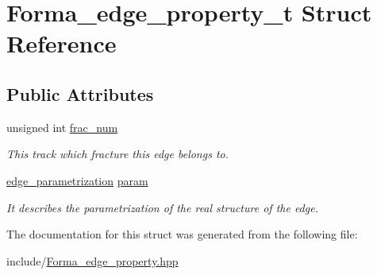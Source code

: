 \hypertarget{structForma__edge__property__t}{
\section{Forma\_\-edge\_\-property\_\-t Struct Reference}
\label{structForma__edge__property__t}
}
\subsection*{Public Attributes}
\begin{DoxyCompactItemize}
\item 
\hypertarget{structForma__edge__property__t_a19a172372d64ba7d3ffa79eaa22a5a2a}{
unsigned int \hyperlink{structForma__edge__property__t_a19a172372d64ba7d3ffa79eaa22a5a2a}{frac\_\-num}}
\label{structForma__edge__property__t_a19a172372d64ba7d3ffa79eaa22a5a2a}

\begin{DoxyCompactList}\small\item\em This track which fracture this edge belongs to. \item\end{DoxyCompactList}\item 
\hypertarget{structForma__edge__property__t_acc9640a769c9abce25e3e89310e7479c}{
\hyperlink{classedge__parametrization}{edge\_\-parametrization} \hyperlink{structForma__edge__property__t_acc9640a769c9abce25e3e89310e7479c}{param}}
\label{structForma__edge__property__t_acc9640a769c9abce25e3e89310e7479c}

\begin{DoxyCompactList}\small\item\em It describes the parametrization of the real structure of the edge. \item\end{DoxyCompactList}\end{DoxyCompactItemize}


The documentation for this struct was generated from the following file:\begin{DoxyCompactItemize}
\item 
include/\hyperlink{Forma__edge__property_8hpp}{Forma\_\-edge\_\-property.hpp}\end{DoxyCompactItemize}
